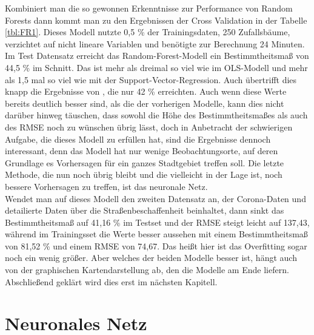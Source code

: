 \documentclass[a4paper,12pt]{thesis}
\begin{document}
Kombiniert man die so gewonnen Erkenntnisse zur Performance von Random Forests dann kommt man zu den Ergebnissen der Cross Validation in der Tabelle \ref{tbl:FR1}. Dieses Modell nutzte 0,5 \% der Trainingsdaten, 250 Zufallsbäume, verzichtet auf nicht lineare Variablen und benötigte zur Berechnung 24 Minuten. Im Test Datensatz erreicht das Random-Forest-Modell ein Bestimmtheitsmaß von 44,5 \% im Schnitt. Das ist mehr als dreimal so viel wie im OLS-Modell und mehr als 1,5 mal so viel wie mit der Support-Vector-Regression. Auch übertrifft dies knapp die Ergebnisse von \cite{Alattar2021}, die nur 42 \% erreichten. Auch wenn diese Werte bereits deutlich besser sind, als die der vorherigen Modelle, kann dies nicht darüber hinweg täuschen, dass sowohl die Höhe des Bestimmtheitsmaßes als auch des RMSE noch zu wünschen übrig lässt, doch in Anbetracht der schwierigen Aufgabe, die dieses Modell zu erfüllen hat, sind die Ergebnisse dennoch interessant, denn das Modell hat nur wenige Beobachtungsorte, auf deren Grundlage es Vorhersagen für ein ganzes Stadtgebiet treffen soll. Die letzte Methode, die nun noch übrig bleibt und die vielleicht in der Lage ist, noch bessere Vorhersagen zu treffen, ist das neuronale Netz.\\

Wendet man auf dieses Modell den zweiten Datensatz an, der Corona-Daten und detailierte Daten über die Straßenbeschaffenheit beinhaltet, dann sinkt das Bestimmtheitsmaß auf 41,16 \% im Testset und der RMSE steigt leicht auf 137,43, während im Trainingsset die Werte besser aussehen mit einem Bestimmtheitsmaß von 81,52 \% und einem RMSE von 74,67. Das heißt hier ist das Overfitting sogar noch ein wenig größer. Aber welches der beiden Modelle besser ist, hängt auch von der graphischen Kartendarstellung ab, den die Modelle am Ende liefern. Abschließend geklärt wird dies erst im nächsten Kapitell. 

\section{Neuronales Netz}
\end{document}
